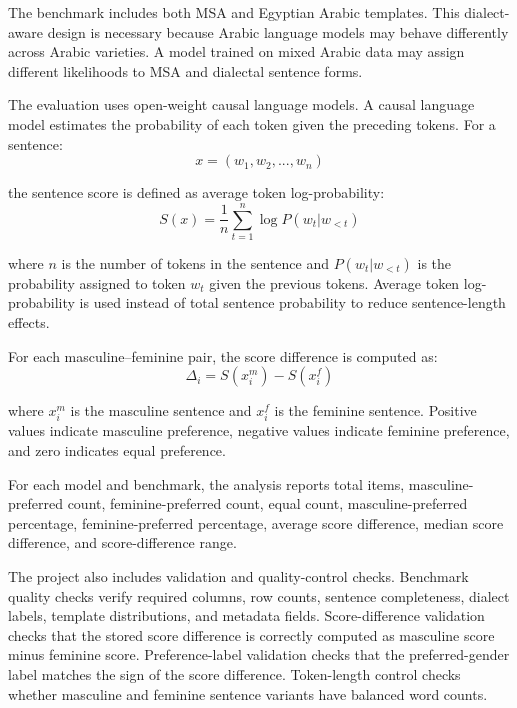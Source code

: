 \documentclass[conference]{IEEEtran}
\begin{document}
The benchmark includes both MSA and Egyptian Arabic templates. This dialect-aware design is necessary because Arabic language models may behave differently across Arabic varieties. A model trained on mixed Arabic data may assign different likelihoods to MSA and dialectal sentence forms.

The evaluation uses open-weight causal language models. A causal language model estimates the probability of each token given the preceding tokens. For a sentence:
\begin{equation}
x = (w_1, w_2, ..., w_n)
\end{equation}

the sentence score is defined as average token log-probability:
\begin{equation}
S(x) = \frac{1}{n} \sum_{t=1}^{n} \log P(w_t | w_{<t})
\end{equation}

where \(n\) is the number of tokens in the sentence and \(P(w_t | w_{<t})\) is the probability assigned to token \(w_t\) given the previous tokens. Average token log-probability is used instead of total sentence probability to reduce sentence-length effects.

For each masculine--feminine pair, the score difference is computed as:
\begin{equation}
\Delta_i = S(x_i^m) - S(x_i^f)
\end{equation}

where \(x_i^m\) is the masculine sentence and \(x_i^f\) is the feminine sentence. Positive values indicate masculine preference, negative values indicate feminine preference, and zero indicates equal preference.

For each model and benchmark, the analysis reports total items, masculine-preferred count, feminine-preferred count, equal count, masculine-preferred percentage, feminine-preferred percentage, average score difference, median score difference, and score-difference range.

The project also includes validation and quality-control checks. Benchmark quality checks verify required columns, row counts, sentence completeness, dialect labels, template distributions, and metadata fields. Score-difference validation checks that the stored score difference is correctly computed as masculine score minus feminine score. Preference-label validation checks that the preferred-gender label matches the sign of the score difference. Token-length control checks whether masculine and feminine sentence variants have balanced word counts.
\end{document}
